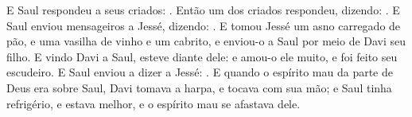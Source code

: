{  E Saul respondeu a seus criados: .
  Então um dos criados respondeu, dizendo: .
  E Saul enviou mensageiros a Jessé, dizendo: .
  E tomou Jessé um asno carregado de pão, e uma vasilha de vinho e um cabrito, e enviou-o a Saul por meio de Davi seu filho.
  E vindo Davi a Saul, esteve diante dele: e amou-o ele muito, e foi feito seu escudeiro.
  E Saul enviou a dizer a Jessé: .
  E quando o espírito mau da parte de Deus era sobre Saul, Davi tomava a harpa, e tocava com sua mão; e Saul tinha refrigério, e estava melhor, e o espírito mau se afastava dele.
\par }

